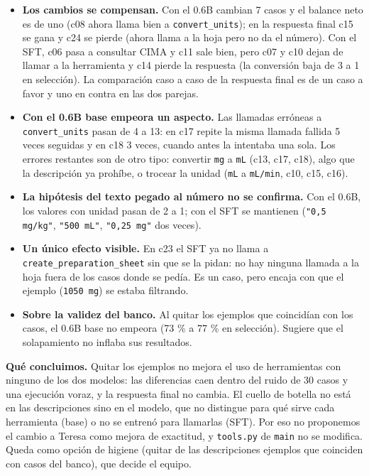 \begin{itemize}
\tightlist
\item
  \textbf{Los cambios se compensan.} Con el 0.6B cambian 7 casos y el balance neto es de uno (c08 ahora
  llama bien a \texttt{convert\_\allowbreak{}units}); en la respuesta final c15 se gana y c24 se pierde (ahora llama a
  la hoja pero no da el número). Con el SFT, c06 pasa a consultar CIMA y c11 sale bien, pero c07 y
  c10 dejan de llamar a la herramienta y c14 pierde la respuesta (la conversión baja de 3 a 1 en
  selección). La comparación caso a caso de la respuesta final es de un caso a favor y uno en
  contra en las dos parejas.
\item
  \textbf{Con el 0.6B base empeora un aspecto.} Las llamadas erróneas a \texttt{convert\_\allowbreak{}units} pasan de 4 a 13:
  en c17 repite la misma llamada fallida 5 veces seguidas y en c18 3 veces, cuando antes la
  intentaba una sola. Los errores restantes son de otro tipo: convertir \texttt{mg} a \texttt{mL} (c13, c17,
  c18), algo que la descripción ya prohíbe, o trocear la unidad (\texttt{mL} a \texttt{mL/\allowbreak{}min}, c10, c15, c16).
\item
  \textbf{La hipótesis del texto pegado al número no se confirma.} Con el 0.6B, los valores con unidad
  pasan de 2 a 1; con el SFT se mantienen (\texttt{"0,5 mg/\allowbreak{}kg"}, \texttt{"500 mL"}, \texttt{"0,25 mg"} dos veces).
\item
  \textbf{Un único efecto visible.} En c23 el SFT ya no llama a \texttt{create\_\allowbreak{}preparation\_\allowbreak{}sheet} sin que se
  la pidan: no hay ninguna llamada a la hoja fuera de los casos donde se pedía. Es un caso, pero
  encaja con que el ejemplo (\texttt{1050 mg}) se estaba filtrando.
\item
  \textbf{Sobre la validez del banco.} Al quitar los ejemplos que coincidían con los casos, el 0.6B base
  no empeora (73 \% a 77 \% en selección). Sugiere que el solapamiento no inflaba sus resultados.
\end{itemize}

\textbf{Qué concluimos.} Quitar los ejemplos no mejora el uso de herramientas con ninguno de los dos
modelos: las diferencias caen dentro del ruido de 30 casos y una ejecución voraz, y la respuesta
final no cambia. El cuello de botella no está en las descripciones sino en el modelo, que no
distingue para qué sirve cada herramienta (base) o no se entrenó para llamarlas (SFT). Por eso no
proponemos el cambio a Teresa como mejora de exactitud, y \texttt{tools.py} de \texttt{main} no se modifica.
Queda como opción de higiene (quitar de las descripciones ejemplos que coinciden con casos del
banco), que decide el equipo.

